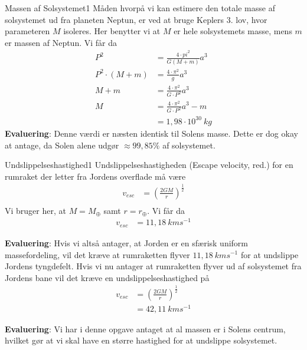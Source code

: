 \begin{opgave}{Massen af Solsystemet}{1}
  \opg Måden hvorpå vi kan estimere den totale masse af solsystemet ud fra planeten Neptun, er ved at bruge Keplers 3. lov, hvor parameteren $M$ isoleres. Her benytter vi at $M$ er hele solsystemets masse, mens $m$ er massen af Neptun. Vi får da
\begin{align*}
P^2 &= \frac{4\cdot pi^2}{G(M+m)}a^3 \\
P^2 \cdot (M+m) &= \frac{4\cdot \pi^2}{g}a^3 \\
M+m &= \frac{4\cdot \pi^2}{G\cdot P^2}a^3 \\
M &= \frac{4\cdot \pi^2}{G\cdot P^2}a^3 - m \\
&= 1,98\cdot 10^{30}~\si{kg}
\end{align*} 
\textbf{Evaluering}: Denne værdi er næsten identisk til Solens masse. Dette er dog okay at antage, da Solen alene udgør $\approx 99,85\%$ af solsystemet. 
\end{opgave}

\begin{opgave}{Undslippelseshastighed}{1}
 \opg Undslippelseshastigheden (Escape velocity, red.) for en rumraket der letter fra Jordens overflade må være
  \begin{align*}
  v_{esc} &= \left(\frac{2GM}{r}\right)^{\frac{1}{2}} \\
  \end{align*}
Vi bruger her, at $M = M_{\oplus}$ samt $r = r_{\oplus}$. Vi får da
\begin{align*}
v_{esc} &= 11,18~\si{km} \si{s}^{-1} 
\end{align*}
  
\textbf{Evaluering}: Hvis vi altså antager, at Jorden er en sfærisk uniform massefordeling, vil det kræve at rumraketten flyver $11,18~\si{km} \si{s}^{-1}$ for at undslippe Jordens tyngdefelt. 
\opg Hvis vi nu antager at rumraketten flyver ud af solsystemet fra Jordens bane vil det kræve en undslippelseshastighed på
\begin{align*}
 v_{esc} &= \left(\frac{2GM}{r}\right)^{\frac{1}{2}} \\
 &= 42,11~\si{km} \si{s}^{-1} 
\end{align*}

\textbf{Evaluering}: Vi har i denne opgave antaget at al massen er i Solens centrum, hvilket gør at vi skal have en større hastighed for at undslippe solsystemet. 
\end{opgave}

